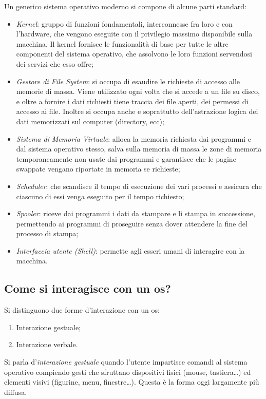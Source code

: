 Un  generico sistema operativo moderno si compone di alcune parti standard:
\begin{itemize}
	\item
\emph{Kernel}: gruppo di funzioni fondamentali, interconnesse fra loro e con l'hardware, che vengono eseguite con il privilegio massimo disponibile sulla macchina. Il kernel fornisce le funzionalità di base per tutte le altre componenti del sistema operativo, che assolvono le loro funzioni servendosi dei servizi che esso offre;
	\item
\emph{Gestore di File System}: si occupa di esaudire le richieste di accesso alle memorie di massa. Viene utilizzato ogni volta che si accede a un file su disco, e oltre a fornire i dati richiesti tiene traccia dei file aperti, dei permessi di accesso ai file. Inoltre si occupa anche e soprattutto dell'astrazione logica dei dati memorizzati sul computer (directory, ecc);
	\item
\emph{Sistema di Memoria Virtuale}: alloca la memoria richiesta dai programmi e dal sistema operativo stesso, salva sulla memoria di massa le zone di memoria temporaneamente non usate dai programmi e garantisce che le pagine swappate vengano riportate in memoria se richieste;
	\item
\emph{Scheduler}: che scandisce il tempo di esecuzione dei vari processi e assicura che ciascuno di essi venga eseguito per il tempo richiesto;
	\item
\emph{Spooler}: riceve dai programmi i dati da stampare e li stampa in successione, permettendo ai programmi di proseguire senza dover attendere la fine del processo di stampa;
	\item
\emph{Interfaccia utente \emph{(Shell)}}: permette agli esseri umani di interagire con la macchina.
\end{itemize}

	\subsection{Come si interagisce con un \acs{os}?}
	\label{subsec:inter}

Si distinguono due forme d'interazione con un \ac{os}:
\begin{enumerate}
	\item
Interazione gestuale;
	\item
Interazione verbale.
\end{enumerate}
Si parla d'\emph{interazione gestuale} quando l'utente impartisce comandi al sistema operativo compiendo gesti che sfruttano dispositivi fisici (mouse, tastiera\dots) ed elementi visivi (figurine, menu, finestre\dots). Questa è la forma oggi largamente più diffusa.


